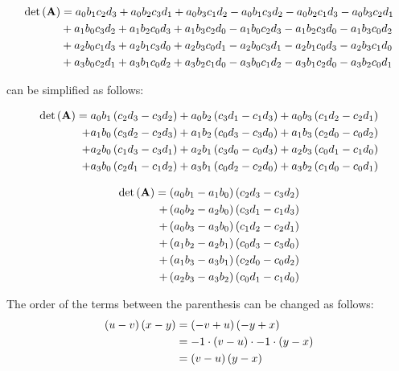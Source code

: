 \begin{align}
\mathrm{det}\left(\mathbf{A}\right)
&
= a_0b_1c_2d_3 
+ a_0b_2c_3d_1 
+ a_0b_3c_1d_2
- a_0b_1c_3d_2
- a_0b_2c_1d_3 
- a_0b_3c_2d_1\nonumber\\
&
+ a_1b_0c_3d_2
+ a_1b_2c_0d_3
+ a_1b_3c_2d_0
- a_1b_0c_2d_3
- a_1b_2c_3d_0
- a_1b_3c_0d_2\nonumber\\
&
+ a_2b_0c_1d_3
+ a_2b_1c_3d_0
+ a_2b_3c_0d_1
- a_2b_0c_3d_1
- a_2b_1c_0d_3
- a_2b_3c_1d_0\nonumber\\
&
+ a_3b_0c_2d_1
+ a_3b_1c_0d_2
+ a_3b_2c_1d_0
- a_3b_0c_1d_2
- a_3b_1c_2d_0
- a_3b_2c_0d_1\label{eq:determinant4x4}
\end{align}

 can be simplified as follows:

\begin{align*}
\mathrm{det}\left(\mathbf{A}\right)
= a_0b_1 \left(c_2d_3 - c_3d_2\right) 
+ a_0b_2 \left(c_3d_1 - c_1d_3\right)
+ a_0b_3 \left(c_1d_2 - c_2d_1\right)\\
+ a_1b_0 \left(c_3d_2 - c_2d_3\right)
+ a_1b_2 \left(c_0d_3 - c_3d_0\right)
+ a_1b_3 \left(c_2d_0 - c_0d_2\right)\\
+ a_2b_0 \left(c_1d_3 - c_3d_1\right)
+ a_2b_1 \left(c_3d_0 - c_0d_3\right)
+ a_2b_3 \left(c_0d_1 - c_1d_0\right)\\
+ a_3b_0 \left(c_2d_1 - c_1d_2\right)
+ a_3b_1 \left(c_0d_2 - c_2d_0\right)
+ a_3b_2 \left(c_1d_0 - c_0d_1\right)
\end{align*}




\begin{align*}
\mathrm{det}\left(\mathbf{A}\right)
= \left(a_0b_1 - a_1b_0\right) \left(c_2d_3 - c_3d_2\right)\\
+ \left(a_0b_2 - a_2b_0\right) \left(c_3d_1 - c_1d_3\right)\\
+ \left(a_0b_3 - a_3b_0\right) \left(c_1d_2 - c_2d_1\right)\\
+ \left(a_1b_2 - a_2b_1\right) \left(c_0d_3 - c_3d_0\right)\\
+ \left(a_1b_3 - a_3b_1\right) \left(c_2d_0 - c_0d_2\right)\\
+ \left(a_2b_3 - a_3b_2\right) \left(c_0d_1 - c_1d_0\right)\\
\end{align*}

The order of the terms between the parenthesis can be changed as follows:
\begin{align*}
\left(u-v\right)\left(x-y\right) 
&= \left(-v+u\right)\left(-y+x\right)\\
&= -1\cdot\left(v-u\right)\cdot -1 \cdot \left(y-x\right) \\
&= \left(v-u\right)\left(y-x\right) 
\end{align*} 

